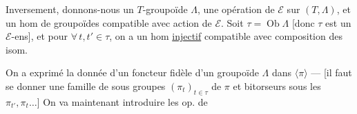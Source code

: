 Inversement, donnons-nous  un $T$-groupoïde  $\Lambda$, une opération de $\mathcal E$ sur $(T,\Lambda)$, et un hom de groupoïdes
compatible avec action de $\mathcal E$.
Soit $\tau=\operatorname{Ob}\Lambda$ [donc $\tau$ est un $\mathcal E$-ens], et pour $\forall\,t,t'\in\tau$, on a un hom \uline{injectif}
compatible avec composition des isom.

On a exprimé la donnée d'un foncteur fidèle d'un groupoïde $\Lambda$ dans $\langle\pi\rangle$ ---  [il faut se donner une famille de sous groupes $(\pi_t)_{t\in\tau}$ de $\pi$ et  bitorseurs sous les $\pi_{t'},\pi_t\ldots$] On va maintenant introduire les op. de
